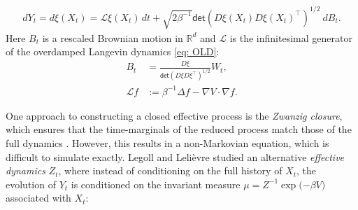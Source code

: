 \documentclass[reqno, 12pt]{article}
\begin{document}
\begin{align}
    dY_t = d\xi(X_t) = \mathcal{L}\xi(X_t)\,dt + \sqrt{2\beta^{-1}}\textsf{det}(D\xi(X_t)D\xi(X_t)^{\top})^{1/2} \:dB_t. \label{eq: projected dynamics}
\end{align}
Here $B_t$ is a rescaled Brownian motion in $\mathbb{R}^d$ and $\mathcal{L}$ is the infinitesimal generator of the overdamped Langevin dynamics \eqref{eq: OLD}:
\begin{align}
    B_t &= \frac{D\xi}{\textsf{det}\left(D\xi D\xi^{\top}\right)^{1/2}}W_t, \label{eq: conditioning formulae} \\
    \mathcal{L}f &:= \beta^{-1}\Delta f - \nabla V \cdot \nabla f.     \label{eq:generator}
\end{align}

One approach to constructing a closed effective process is the \emph{Zwanzig closure}, which ensures that the time-marginals of the reduced process match those of the full dynamics \parencite{givon2004extracting}. However, this results in a non-Markovian equation, which is difficult to simulate exactly. Legoll and Lelièvre \parencite{legoll2010effective} studied an alternative \emph{effective dynamics} $Z_t$, where instead of conditioning on the full history of $X_t$, the evolution of \( Y_t \) is conditioned on the invariant measure $\mu = Z^{-1} \exp{(-\beta V})$ associated with $X_t$: 
\end{document}
